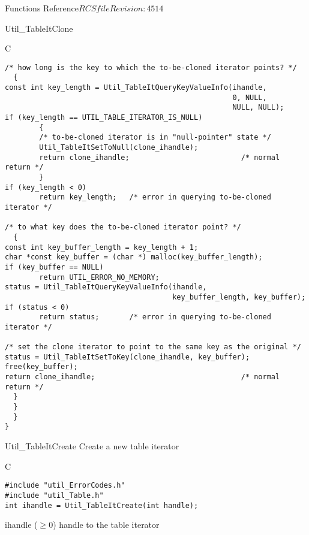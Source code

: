 \begin{cactuspart}{ Functions Reference}{$RCSfile$}{$Revision: 4514 $}
\begin{FunctionDescription}{Util\_TableItClone}
\begin{ExampleSection}
\begin{Example}{C}
\begin{verbatim}
/* how long is the key to which the to-be-cloned iterator points? */
  {
const int key_length = Util_TableItQueryKeyValueInfo(ihandle,
                                                     0, NULL,
                                                     NULL, NULL);
if (key_length == UTIL_TABLE_ITERATOR_IS_NULL)
        {
        /* to-be-cloned iterator is in "null-pointer" state */
        Util_TableItSetToNull(clone_ihandle);
        return clone_ihandle;                          /* normal return */
        }
if (key_length < 0)
        return key_length;   /* error in querying to-be-cloned iterator */

/* to what key does the to-be-cloned iterator point? */
  {
const int key_buffer_length = key_length + 1;
char *const key_buffer = (char *) malloc(key_buffer_length);
if (key_buffer == NULL)
        return UTIL_ERROR_NO_MEMORY;
status = Util_TableItQueryKeyValueInfo(ihandle,
                                       key_buffer_length, key_buffer);
if (status < 0)
        return status;       /* error in querying to-be-cloned iterator */

/* set the clone iterator to point to the same key as the original */
status = Util_TableItSetToKey(clone_ihandle, key_buffer);
free(key_buffer);
return clone_ihandle;                                  /* normal return */
  }
  }
  }
}
\end{verbatim}
\end{Example}
\end{ExampleSection}
\end{FunctionDescription}


\begin{FunctionDescription}{Util\_TableItCreate}
\label{Util-TableItCreate}
Create a new table iterator

\begin{SynopsisSection}
\begin{Synopsis}{C}
\begin{verbatim}
#include "util_ErrorCodes.h"
#include "util_Table.h"
int ihandle = Util_TableItCreate(int handle);
\end{verbatim}
\end{Synopsis}
\end{SynopsisSection}

\begin{ResultSection}
\begin{Result}{ihandle ($\ge 0$)}
handle to the table iterator
\end{Result}
\end{ResultSection}


\end{FunctionDescription}
\end{cactuspart}
